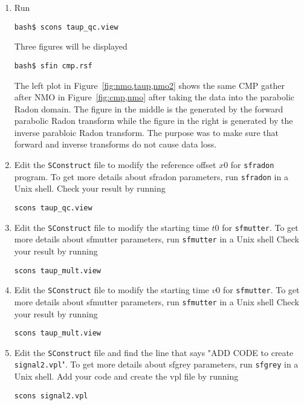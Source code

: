 \begin{enumerate}
\item Run
\begin{verbatim}
bash$ scons taup_qc.view
\end{verbatim}
Three figures will be displayed
\begin{verbatim}
bash$ sfin cmp.rsf
\end{verbatim}


The left plot in Figure~\ref{fig:nmo,taup,nmo2} shows the same CMP gather after NMO in Figure~\ref{fig:cmp,nmo} after taking the data into the parabolic Radon domain. The figure in the middle is the generated by the forward parabolic Radon transform while the figure in the right is generated by the inverse parabloic Radon transform. The purpose was to make sure that forward and inverse transforms do not cause data loss.

\item Edit the \texttt{SConstruct} file to modify the reference offset $x0$ for \texttt{sfradon} program. To get more details about sfradon parameters, run \texttt{sfradon} in a Unix shell. Check your result by running
\begin{verbatim}
scons taup_qc.view
\end{verbatim}

\item Edit the \texttt{SConstruct} file to modify the starting time $t0$ for \texttt{sfmutter}. To get more details about sfmutter parameters, run \texttt{sfmutter} in a Unix shell Check your result by running
\begin{verbatim}
scons taup_mult.view
\end{verbatim}

\item Edit the \texttt{SConstruct} file to modify the starting time $v0$ for \texttt{sfmutter}. To get more details about sfmutter parameters, run \texttt{sfmutter} in a Unix shell Check your result by running
\begin{verbatim}
scons taup_mult.view
\end{verbatim}

\item Edit the \texttt{SConstruct} file and find the line that says "ADD CODE to create \texttt{signal2.vpl}". To get more details about sfgrey parameters, run \texttt{sfgrey} in a Unix shell. Add your code and create the vpl file by running
\begin{verbatim}
scons signal2.vpl
\end{verbatim}


\end{enumerate}
